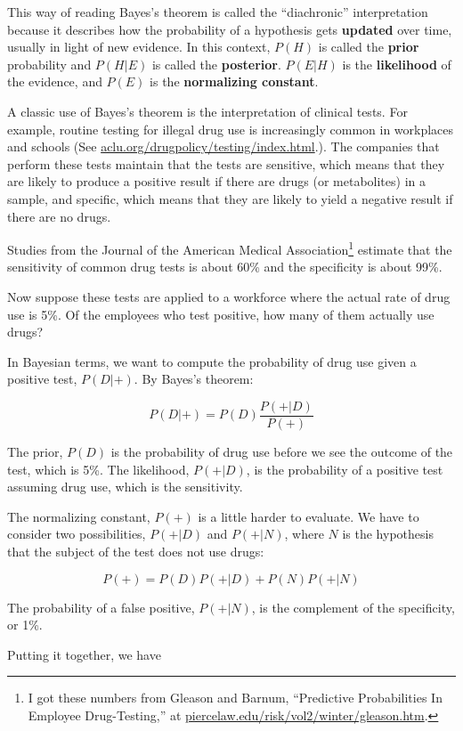 \documentclass[12pt]{book}
\begin{document}
This way of reading Bayes's theorem is called the ``diachronic''
interpretation because it describes how the probability of a
hypothesis gets {\bf updated} over time, usually in light of new
evidence.  In this context, $P(H)$ is called the {\bf prior}
probability and $P(H|E)$ is called the {\bf posterior}.
$P(E|H)$ is the {\bf likelihood} of the evidence, and
$P(E)$ is the {\bf normalizing constant}.

A classic use of Bayes's theorem is the interpretation of clinical
tests.  For example, routine testing for illegal drug use is
increasingly common in workplaces and schools (See
\url{aclu.org/drugpolicy/testing/index.html}.).  The companies that
perform these tests maintain that the tests are sensitive, which means
that they are likely to produce a positive result if there are drugs
(or metabolites) in a sample, and specific, which means that they are
likely to yield a negative result if there are no drugs.

Studies from the Journal of the American Medical
Association\footnote{I got these numbers from Gleason and Barnum,
  ``Predictive Probabilities In Employee Drug-Testing,'' at
  \url{piercelaw.edu/risk/vol2/winter/gleason.htm}.} estimate that
the sensitivity of common drug tests is about 60\% and the specificity
is about 99\%.

Now suppose these tests are applied to a workforce where the
actual rate of drug use is 5\%.  Of the employees who test positive,
how many of them actually use drugs?

In Bayesian terms, we want to compute the probability of
drug use given a positive test, $P(D|+)$.  By Bayes's theorem:

\[ P(D|+) = P(D) \frac{P(+|D)}{P(+)} \]

The prior, $P(D)$ is the probability of drug use before we
see the outcome of the test, which is 5\%.
The likelihood, $P(+|D)$, is the probability
of a positive test assuming drug use, which is the sensitivity.

The normalizing constant, $P(+)$ is a little harder to evaluate.  We
have to consider two possibilities, $P(+|D)$ and $P(+|N)$, where $N$
is the hypothesis that the subject of the test does not use drugs:

\[ P(+) = P(D) P(+|D) + P(N) P(+|N) \]

The probability of a false positive, $P(+|N)$, is the complement
of the specificity, or 1\%.

Putting it together, we have
\end{document}
